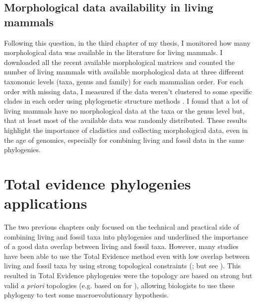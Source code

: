 \subsection{Morphological data availability in living mammals}
Following this question, in the third chapter of my thesis, I monitored how many morphological data was available in the literature for living mammals.
I downloaded all the recent available morphological matrices and counted the number of living mammals with available morphological data at three different taxonomic levels (taxa, genus and family) for each mammalian order.
For each order with missing data, I measured if the data weren't clustered to some specific clades in each order using phylogenetic structure methods \citep{webb2002phylogenies}.
I found that a lot of living mammals have no morphological data at the taxa or the genus level but, that at least most of the available data was randomly distributed.
These results highlight the importance of cladistics and collecting morphological data, even in the age of genomics, especially for combining living and fossil data in the same phylogenies.

\section{Total evidence phylogenies applications}
The two previous chapters only focused on the technical and practical side of combining living and fossil taxa into phylogenies and underlined the importance of a good data overlap between living and fossil taxa.
However, many studies have been able to use the Total Evidence method even with low overlap between living and fossil taxa by using strong topological constraints (\citealt{ronquista2012,schragocombining2013,slaterphylogenetic2013,beckancient2014}; but see \citealt{Arcila2015131,Dembo2015}).
This resulted in Total Evidence phylogenies were the topology are based on strong but valid \textit{a priori} topologies (e.g. based on \citealt{meredithimpacts2011} for \citealt{slaterphylogenetic2013}), allowing biologists to use these phylogeny to test some macroevolutionary hypothesis.

